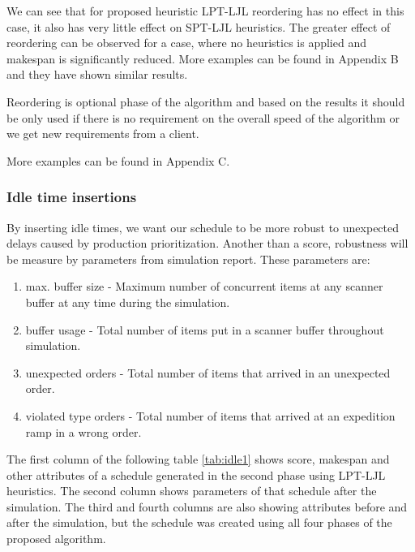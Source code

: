 \documentclass{ctuthesis}
\begin{document}
We can see that for proposed heuristic LPT-LJL reordering has no effect in this case, it also has very little effect on SPT-LJL heuristics. The greater effect of reordering can be observed for a case, where no heuristics is applied and makespan is significantly reduced. More examples can be found in Appendix B and they have shown similar results.

Reordering is optional phase of the algorithm and based on the results it should be only used if there is no requirement on the overall speed of the algorithm or we get new requirements from a client. 

More examples can be found in Appendix C.

\subsubsection{Idle time insertions}
\label{subsubsec:idletimeinsertions}

By inserting idle times, we want our schedule to be more robust to unexpected delays caused by production prioritization. Another than a score, robustness will be measure by parameters from simulation report. These parameters are:

\begin{enumerate}
    \item max. buffer size - Maximum number of concurrent items at any scanner buffer at any time during the simulation.
    \item buffer usage - Total number of items put in a scanner buffer throughout simulation.
    \item unexpected orders - Total number of items that arrived in an unexpected order.
    \item violated type orders - Total number of items that arrived at an expedition ramp in a wrong order.
\end{enumerate}

The first column of the following table  \ref{tab:idle1} shows score, makespan and other attributes of a schedule generated in the second phase using LPT-LJL heuristics. The second column shows parameters of that schedule after the simulation. The third and fourth columns are also showing attributes before and after the simulation, but the schedule was created using all four phases of the proposed algorithm.
\end{document}
